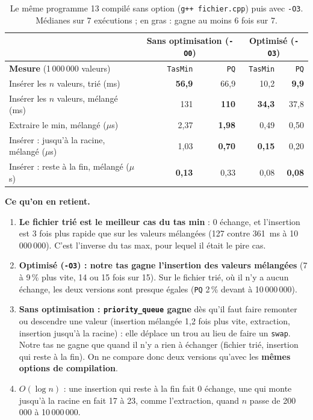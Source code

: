 \documentclass[11pt,a4paper]{article}
\begin{document}
\begin{table}[H]
\centering
\small
\begin{tabular}{|l|r|r|r|r|}
\hline
& \multicolumn{2}{c|}{\textbf{Sans optimisation} (\texttt{-O0})} & \multicolumn{2}{c|}{\textbf{Optimisé} (\texttt{-O3})} \\
\hline
\textbf{Mesure} (1\,000\,000 valeurs) & \texttt{TasMin} & \texttt{PQ} & \texttt{TasMin} & \texttt{PQ} \\
\hline
Insérer les $n$ valeurs, trié (ms)           & \textbf{56,9} & 66,9          & 10,2          & \textbf{9,9} \\
\hline
Insérer les $n$ valeurs, mélangé (ms)        & 131           & \textbf{110}  & \textbf{34,3} & 37,8 \\
\hline
Extraire le min, mélangé ($\mu$s)            & 2,37          & \textbf{1,98} & 0,49          & 0,50 \\
\hline
Insérer : jusqu'à la racine, mélangé ($\mu$s)& 1,03          & \textbf{0,70} & \textbf{0,15} & 0,20 \\
\hline
Insérer : reste à la fin, mélangé ($\mu$s)   & \textbf{0,13} & 0,33          & 0,08          & \textbf{0,08} \\
\hline
\end{tabular}
\caption{Le même programme 13 compilé sans option (\texttt{g++ fichier.cpp}) puis avec
\texttt{-O3}. Médianes sur 7 exécutions ; en gras : gagne au moins 6 fois sur 7.}
\end{table}

\textbf{Ce qu'on en retient.}
\begin{enumerate}
  \item \textbf{Le fichier trié est le meilleur cas du tas min} : 0 échange, et l'insertion
        est 3 fois plus rapide que sur les valeurs mélangées (127 contre 361~ms à
        10\,000\,000). C'est l'inverse du tas max, pour lequel il était le pire cas.
  \item \textbf{Optimisé (\texttt{-O3}) : notre tas gagne l'insertion des valeurs mélangées}
        (7 à 9\,\% plus vite, 14 ou 15 fois sur 15). Sur le fichier trié, où il n'y a aucun
        échange, les deux versions sont presque égales (\texttt{PQ} 2\,\% devant à
        10\,000\,000).
  \item \textbf{Sans optimisation : \texttt{priority\_queue} gagne} dès qu'il faut faire
        remonter ou descendre une valeur (insertion mélangée 1,2 fois plus vite, extraction,
        insertion jusqu'à la racine) : elle déplace un \og trou \fg{} au lieu de faire un
        \texttt{swap}. Notre tas ne gagne que quand il n'y a rien à échanger (fichier trié,
        insertion qui reste à la fin). On ne compare donc deux versions qu'avec les
        \textbf{mêmes options de compilation}.
  \item \textbf{$O(\log n)$} : une insertion qui reste à la fin fait 0 échange, une qui monte
        jusqu'à la racine en fait 17 à 23, comme l'extraction, quand $n$ passe de 200\,000 à
        10\,000\,000.
\end{enumerate}
\end{document}
